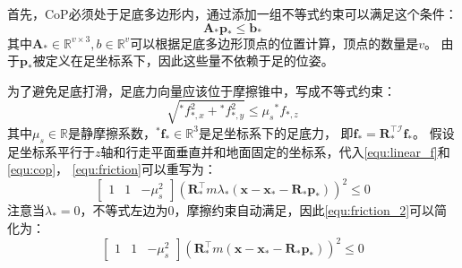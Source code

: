首先，CoP必须处于足底多边形内，通过添加一组不等式约束可以满足这个条件：
\begin{equation}
    \label{equ:inequ_constraint}
    \boldsymbol{A}_* \boldsymbol{p}_* \leq \boldsymbol{b}_*
\end{equation}
其中$\boldsymbol{A}_* \in \mathbb{R}^{v \times 3}, b \in \mathbb{R}^{v}$可以根据足底多边形顶点的位置计算，顶点的数量是$v$。
由于$\boldsymbol{p}_*$被定义在足坐标系下，因此这些量不依赖于足的位姿。

为了避免足底打滑，足底力向量应该位于摩擦锥中，写成不等式约束：
\begin{equation}
    \label{equ:friction}
    \sqrt{{ }^* f_{*, x}^2+{ }^* f_{*, y}^2} \leq \mu_s{ }^* f_{*, z}
\end{equation}
其中$\mu_s \in \mathbb{R}$是静摩擦系数，${ }^* \boldsymbol{f}_* \in \mathbb{R}^{3}$是足坐标系下的足底力，
即$\boldsymbol{f}_*=\boldsymbol{R}_*^{\top \mathcal{I}} \boldsymbol{f}_*$。
假设足坐标系平行于$z$轴和行走平面垂直并和地面固定的坐标系，代入\autoref{equ:linear_f}和\autoref{equ:cop}，
\autoref{equ:friction}可以重写为：
\begin{equation}
    \label{equ:friction_2}
    \left[\begin{array}{lll}
        1 & 1 & -\mu_s^2
        \end{array}\right]\left(\boldsymbol{R}_*^{\top} m \lambda_*\left(\boldsymbol{x}-\boldsymbol{x}_*-\boldsymbol{R}_* \boldsymbol{p}_*\right)\right)^2 \leq 0
\end{equation}
注意当$\lambda_*=0$，不等式左边为0，摩擦约束自动满足，因此\autoref{equ:friction_2}可以简化为：
\begin{equation}
    \label{equ:friction_simplify}
    \left[\begin{array}{lll}
        1 & 1 & -\mu_s^2
        \end{array}\right]\left(\boldsymbol{R}_*^{\top} m \left(\boldsymbol{x}-\boldsymbol{x}_*-\boldsymbol{R}_* \boldsymbol{p}_*\right)\right)^2 \leq 0
\end{equation}

